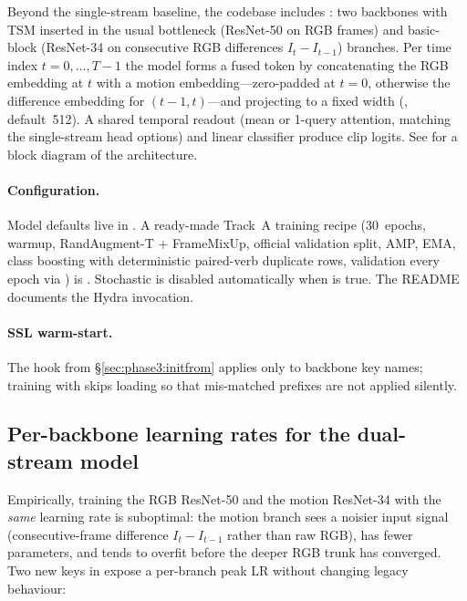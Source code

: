 Beyond the single-stream  baseline, the codebase
includes : two backbones with TSM
inserted in the usual bottleneck (ResNet-50 on RGB frames) and
basic-block (ResNet-34 on consecutive RGB differences
\(I_t - I_{t-1}\)) branches. Per time index \(t=0,\ldots,T-1\) the model
forms a fused token by concatenating the RGB embedding at \(t\) with a
motion embedding---zero-padded at \(t{=}0\), otherwise the difference
embedding for \((t{-}1,t)\)---and projecting to a fixed width
(, default~512). A shared temporal readout (mean or
1-query attention, matching the single-stream head options) and linear
classifier produce clip logits. See
for a block diagram of the architecture.

\paragraph{Configuration.} Model defaults live in
. A ready-made
Track~A training recipe (30~epochs, warmup, RandAugment-T + FrameMixUp,
official validation split, AMP, EMA, class boosting with deterministic
paired-verb duplicate rows, validation every epoch via
) is
.
Stochastic  is disabled automatically
when  is true. The README documents
the Hydra invocation.

\paragraph{SSL warm-start.} The  hook from
\S\ref{sec:phase3:initfrom} applies only to 
backbone key names; training with 
skips loading so that mis-matched prefixes are not applied silently.

\subsection{Per-backbone learning rates for the dual-stream model}
\label{sec:dual-stream-per-backbone-lr}

Empirically, training the RGB ResNet-50 and the motion ResNet-34 with the
\emph{same} learning rate is suboptimal: the motion branch sees a noisier
input signal (consecutive-frame difference \(I_t-I_{t-1}\) rather than
raw RGB), has fewer parameters, and tends to overfit before the deeper
RGB trunk has converged. Two new keys in 
expose a per-branch peak LR without changing legacy behaviour:

